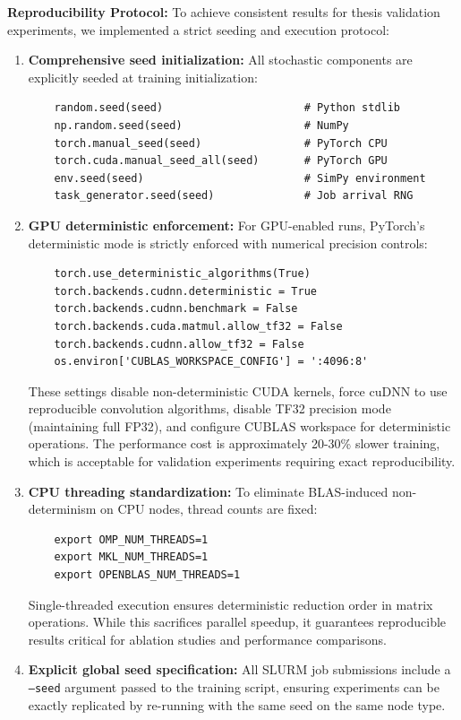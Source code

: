 \textbf{Reproducibility Protocol:} To achieve consistent results for thesis validation experiments, we implemented a strict seeding and execution protocol:
\begin{enumerate}
    \item \textbf{Comprehensive seed initialization:} All stochastic components are explicitly seeded at training initialization:
    \begin{verbatim}
    random.seed(seed)                      # Python stdlib
    np.random.seed(seed)                   # NumPy
    torch.manual_seed(seed)                # PyTorch CPU
    torch.cuda.manual_seed_all(seed)       # PyTorch GPU
    env.seed(seed)                         # SimPy environment
    task_generator.seed(seed)              # Job arrival RNG
    \end{verbatim}
    
    \item \textbf{GPU deterministic enforcement:} For GPU-enabled runs, PyTorch's deterministic mode is strictly enforced with numerical precision controls:
    \begin{verbatim}
    torch.use_deterministic_algorithms(True)
    torch.backends.cudnn.deterministic = True
    torch.backends.cudnn.benchmark = False
    torch.backends.cuda.matmul.allow_tf32 = False
    torch.backends.cudnn.allow_tf32 = False
    os.environ['CUBLAS_WORKSPACE_CONFIG'] = ':4096:8'
    \end{verbatim}
    These settings disable non-deterministic CUDA kernels, force cuDNN to use reproducible convolution algorithms, disable TF32 precision mode (maintaining full FP32), and configure CUBLAS workspace for deterministic operations. The performance cost is approximately 20-30\% slower training, which is acceptable for validation experiments requiring exact reproducibility.
    
    \item \textbf{CPU threading standardization:} To eliminate BLAS-induced non-determinism on CPU nodes, thread counts are fixed:
    \begin{verbatim}
    export OMP_NUM_THREADS=1
    export MKL_NUM_THREADS=1
    export OPENBLAS_NUM_THREADS=1
    \end{verbatim}
    Single-threaded execution ensures deterministic reduction order in matrix operations. While this sacrifices parallel speedup, it guarantees reproducible results critical for ablation studies and performance comparisons.
    
    \item \textbf{Explicit global seed specification:} All SLURM job submissions include a \texttt{--seed} argument passed to the training script, ensuring experiments can be exactly replicated by re-running with the same seed on the same node type.
    

\end{enumerate}
